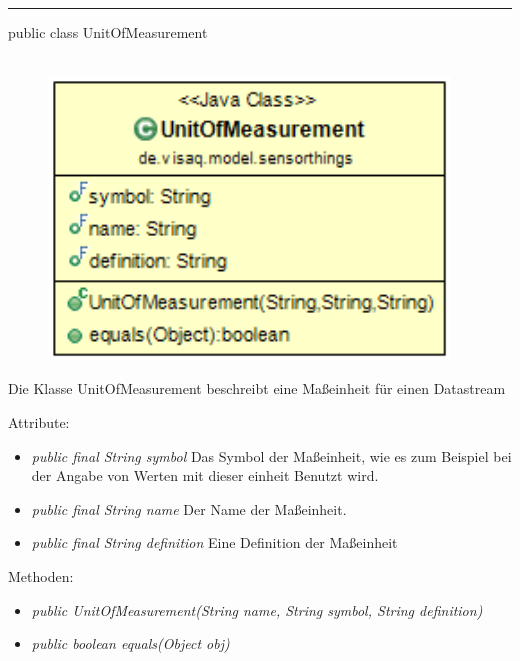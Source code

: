 \rule{\textwidth}{0.3pt}
public class UnitOfMeasurement
\\\\
\begin{minipage}{0.4\textwidth}
    \begin{figure}[H]
        {\centering\includegraphics[width=0.95\textwidth]{media/backend/modell/classes/UnitOfMeasurement.png}}
    \end{figure}
    \end{minipage} \hfill
\begin{minipage}{0.7\textwidth}
    Die Klasse UnitOfMeasurement beschreibt eine Maßeinheit für einen Datastream
\end{minipage}

Attribute:
\begin{itemize}
    \item \emph{public final String symbol} Das Symbol der Maßeinheit, wie es zum Beispiel bei der Angabe von Werten mit dieser einheit Benutzt wird.
    \item \emph{public final String name} Der Name der Maßeinheit.
    \item \emph{public final String definition} Eine Definition der Maßeinheit
\end{itemize}
Methoden:
\begin{itemize}
    \item \emph{public UnitOfMeasurement(String name, String symbol, String definition)}
    \item \emph{public boolean equals(Object obj)} 
\end{itemize}
